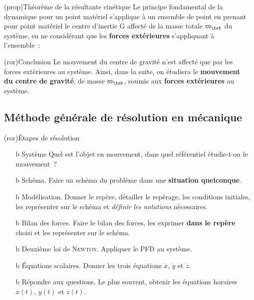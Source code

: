 \documentclass[../../main/main.tex]{subfiles}
\begin{document}
\begin{tcb*}(prop){Théorème de la résultante cinétique}
	Le principe fondamental de la dynamique pour un point matériel s'applique à un
	ensemble de point en prenant pour point matériel le centre d'inertie G affecté
	de la masse totale $m_{\tot}$ du système, en ne considérant que les
	\textbf{forces extérieures} s'appliquant à l'ensemble~: \psw{%
		\[\boxed{m_{\tot}\dv{\vf(\Gr)}{t} = \sum \Ff_{\ext}}\]
	}
\end{tcb*}

\begin{tcb*}(ror){Conclusion}
	Le mouvement du centre de gravité n’est affecté que par les forces extérieures
	au système. Ainsi, dans la suite, on étudiera le \textbf{mouvement du centre
		de gravité}, de masse $m_{\tot}$, soumis aux \textbf{forces extérieures} au
	système.
\end{tcb*}

\subsection{Méthode générale de résolution en mécanique}
\begin{tcb*}(ror){Étapes de résolution}
	\begin{enumerate}[label=\sqenumi]
		\item[b]{Système} Quel est l'objet en mouvement, dans quel
		      référentiel étudie-t-on le mouvement~?

		\item[b]{Schéma.} Faire un schéma du problème dans une \textbf{situation
			      quelconque}.

		\item[b]{Modélisation.} Donner le repère, détailler le repérage, les conditions
		      initiales, les représenter sur le schéma et \textit{définir les notations}
		      nécessaires.

		\item[b]{Bilan des forces.} Faire le bilan des forces, les exprimer \textbf{dans
			      le repère} choisi et les représenter sur le schéma.

		\item[b]{Deuxième loi de \textsc{Newton}.} Appliquer le PFD au système.

		\item[b]{Équations scalaires.} Donner les trois équations $\ddot{x}$,
		      $\ddot{y}$ et $\ddot{z}$.

		\item[b]{Répondre aux questions.} Le plus souvent, obtenir les équations
		      horaires $x(t)$, $y(t)$ et $z(t)$.
	\end{enumerate}
\end{tcb*}
\end{document}
